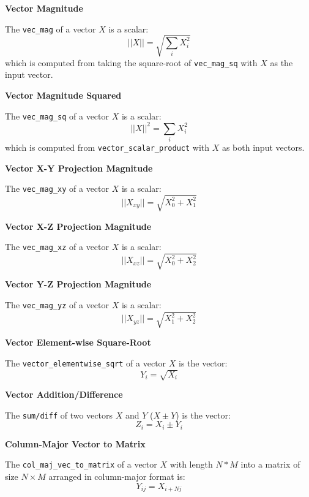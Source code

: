 \documentclass[11pt,fleqn]{report}
\begin{document}
\textbf{Vector Magnitude}

The \texttt{vec\_mag} of a vector $X$ is a scalar:
\begin{equation*} 
||X||=\sqrt{\sum_i X_i^2}
\end{equation*}
which is computed from taking the square-root of \texttt{vec\_mag\_sq}
with $X$ as the input vector. 

\textbf{Vector Magnitude Squared}

The \texttt{vec\_mag\_sq} of a vector $X$ is a scalar:
\begin{equation*} 
||X||^2=\sum_i X_i^2
\end{equation*}
which is computed from \texttt{vector\_scalar\_product} with $X$ as
both input vectors.

\textbf{Vector X-Y Projection Magnitude}

The \texttt{vec\_mag\_xy} of a vector $X$ is a scalar:
\begin{equation*} 
||X_{xy}||=\sqrt{X_0^2 + X_1^2}
\end{equation*}

\textbf{Vector X-Z Projection Magnitude}

The \texttt{vec\_mag\_xz} of a vector $X$ is a scalar:
\begin{equation*} 
||X_{xz}||=\sqrt{X_0^2 + X_2^2}
\end{equation*}

\textbf{Vector Y-Z Projection Magnitude}

The \texttt{vec\_mag\_yz} of a vector $X$ is a scalar:
\begin{equation*} 
||X_{yz}||=\sqrt{X_1^2 + X_2^2}
\end{equation*}

\textbf{Vector Element-wise Square-Root}

The \texttt{vector\_elementwise\_sqrt} of a vector $X$ is the vector:
\begin{equation*} 
Y_i = \sqrt{X_i}
\end{equation*}

\textbf{Vector Addition/Difference}

The \texttt{sum/diff} of two vectors $X$ and $Y$ ($X \pm Y$) is the vector:
\begin{equation*} 
Z_i = X_i \pm Y_i
\end{equation*}

\textbf{Column-Major Vector to Matrix}

The \texttt{col\_maj\_vec\_to\_matrix} of a vector $X$ with length
$N*M$ into a matrix of size $N \times M$ arranged in column-major format is:
\begin{equation*} 
Y_{ij} = X_{i + Nj}
\end{equation*}
\end{document}
